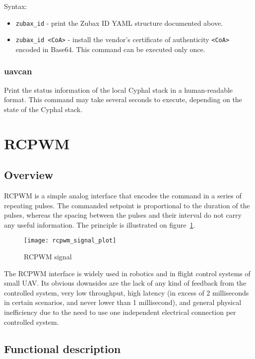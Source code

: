 \documentclass{zubaxdoc}
\begin{document}
Syntax:
\begin{itemize}
	\item \verb|zubax_id| - print the Zubax ID YAML structure documented above.
	\item \verb|zubax_id <CoA>| - install the vendor's certificate of authenticity \verb|<CoA>| encoded in Base64.
	This command can be executed only once.
\end{itemize}

\subsubsection{uavcan}

Print the status information of the local Cyphal stack in a human-readable format.
This command may take several seconds to execute, depending on the state of the Cyphal stack.

\section{RCPWM}

\subsection{Overview}

RCPWM is a simple analog interface that encodes the command in a series of repeating pulses.
The commanded setpoint is proportional to the duration of the pulses,
whereas the spacing between the pulses and their interval do not carry any useful information.
The principle is illustrated on figure~\ref{rcpwm_signal_plot}.

\begin{figure}[hbt]
	\centering
	\texttt{[image: rcpwm\_signal\_plot]}
	\caption{RCPWM signal
		\label{rcpwm_signal_plot}}
\end{figure}

The RCPWM interface is widely used in robotics and in flight control systems of small UAV.
Its obvious downsides are the lack of any kind of feedback from the controlled system,
very low throughput,
high latency (in excess of 2 milliseconds in certain scenarios, and never lower than 1 millisecond),
and general physical inefficiency due to the need to use one independent electrical connection
per controlled system.

\subsection{Functional description}
\end{document}
